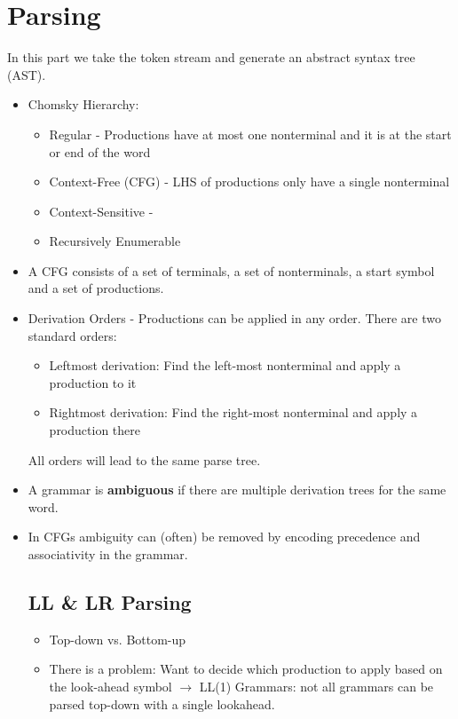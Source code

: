 \section*{Parsing}

In this part we take the token stream and generate an abstract syntax tree (AST).

\begin{itemize}
	\item Chomsky Hierarchy: 
		\begin{itemize}
			\item Regular - Productions have at most one nonterminal and it is at the start or end of the word
			\item Context-Free (CFG) - LHS of productions only have a single nonterminal
			\item Context-Sensitive - 
			\item Recursively Enumerable
		\end{itemize}
	
	\item A CFG consists of a set of terminals, a set of nonterminals, a start symbol and a set of productions.

	\item Derivation Orders - Productions can be applied in any order. There are two standard orders:
	\begin{itemize}
		\item Leftmost derivation: Find the left-most nonterminal and apply a production to it
		\item Rightmost derivation: Find the right-most nonterminal and apply a production there
	\end{itemize}
	All orders will lead to the same parse tree.
	
	\item A grammar is \textbf{ambiguous} if there are multiple derivation trees for the same word.
	
	\item In CFGs ambiguity can (often) be removed by encoding precedence and associativity in the grammar.
	
	\subsection*{LL \& LR Parsing}
	\begin{itemize}
		\item Top-down vs. Bottom-up
		
		\item There is a problem: Want to decide which production to apply based on the look-ahead symbol $\rightarrow$ LL(1) Grammars: not all grammars can be parsed top-down with a single lookahead.
		

\end{itemize}
\end{itemize}

